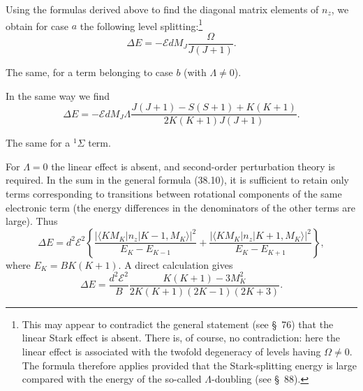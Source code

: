 Using the formulas derived above to find the diagonal matrix elements of $n_z$, we obtain for case $a$ the following level splitting:\footnote{This may appear to contradict the general statement (see \S~76) that the linear Stark effect is absent. There is, of course, no contradiction: here the linear effect is associated with the twofold degeneracy of levels having $\Omega\ne0$. The formula therefore applies provided that the Stark-splitting energy is large compared with the energy of the so-called $\Lambda$-doubling (see \S~88).}
\[
\Delta E=-\mathcal E dM_J\frac{\Omega}{J(J+1)}.
\]

\ProblemHeading[2] The same, for a term belonging to case $b$ (with $\Lambda\ne0$).

\SolutionHeading In the same way we find
\[
\Delta E=-\mathcal E dM_J\Lambda\frac{J(J+1)-S(S+1)+K(K+1)}{2K(K+1)J(J+1)}.
\]

\ProblemHeading[3] The same for a ${}^1\Sigma$ term.

\SolutionHeading For $\Lambda=0$ the linear effect is absent, and second-order perturbation theory is required. In the sum in the general formula (38.10), it is sufficient to retain only terms corresponding to transitions between rotational components of the same electronic term (the energy differences in the denominators of the other terms are large). Thus
\[
\Delta E=d^2\mathcal E^2\left\{\frac{|\langle KM_K|n_z|K-1,M_K\rangle|^2}{E_K-E_{K-1}}+\frac{|\langle KM_K|n_z|K+1,M_K\rangle|^2}{E_K-E_{K+1}}\right\},
\]
where $E_K=BK(K+1)$. A direct calculation gives
\[
\Delta E=\frac{d^2\mathcal E^2}{B}\frac{K(K+1)-3M_K^2}{2K(K+1)(2K-1)(2K+3)}.
\]
